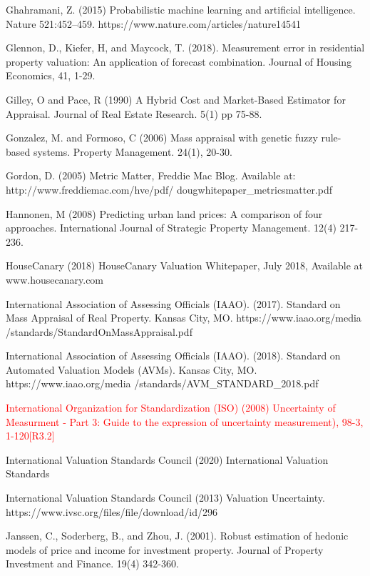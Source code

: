 \documentclass[colTwo]{anon}
\theoremstyle{definition}
\begin{document}
\begin{thebibliography}{50}
\harvarditem{}{}{}Ghahramani, Z. (2015) Probabilistic machine learning and artificial intelligence. Nature 521:452–459. https://www.nature.com/articles/nature14541

\harvarditem{}{}{}Glennon, D., Kiefer, H, and Maycock, T. (2018). Measurement error in residential property valuation: An application of forecast combination. Journal of Housing Economics, 41, 1-29. 

\harvarditem{}{}{}Gilley, O and Pace, R (1990) A Hybrid Cost and Market-Based Estimator for Appraisal. Journal of Real Estate Research. 5(1) pp 75-88. 

\harvarditem{}{}{}Gonzalez, M. and Formoso, C (2006) Mass appraisal with genetic fuzzy rule-based systems. Property Management. 24(1), 20-30. 

\harvarditem{}{}{}Gordon, D. (2005) Metric Matter, Freddie Mac Blog. Available at: http://www.freddiemac.com/hve/pdf/ dougwhitepaper\_metricsmatter.pdf

\harvarditem{}{}{}Hannonen, M (2008) Predicting urban land prices: A comparison of four approaches. International Journal of Strategic Property Management. 12(4) 217-236. 

\harvarditem{}{}{}HouseCanary (2018) HouseCanary Valuation Whitepaper, July 2018, Available at www.housecanary.com

\harvarditem{}{}{}International Association of Assessing Officials (IAAO). (2017). Standard on Mass Appraisal of Real Property. Kansas City, MO. https://www.iaao.org/media /standards/StandardOnMassAppraisal.pdf

\harvarditem{}{}{}International Association of Assessing Officials (IAAO). (2018). Standard on Automated Valuation Models (AVMs). Kansas City, MO. https://www.iaao.org/media /standards/AVM\_STANDARD\_2018.pdf

\harvarditem{}{}{} \textcolor{red}{International Organization for Standardization (ISO) (2008) Uncertainty of Measurment - Part 3: Guide to the expression of uncertainty measurement), 98-3, 1-120[R3.2]}

\harvarditem{}{}{}International Valuation Standards Council (2020) International Valuation Standards 

\harvarditem{}{}{}International Valuation Standards Council (2013) Valuation Uncertainty. https://www.ivsc.org/files/file/download/id/296

\harvarditem{}{}{}Janssen, C., Soderberg, B., and Zhou, J. (2001). Robust estimation of hedonic models of price and income for investment property. Journal of Property Investment and Finance. 19(4) 342-360. 


\end{thebibliography}
\end{document}
